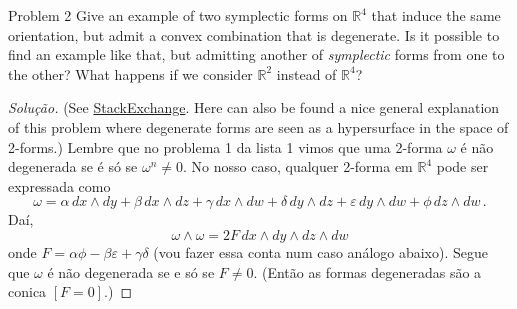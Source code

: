 \begin{idea8}{Problem 2}\leavevmode
	Give an example of two symplectic forms on $\mathbb{R}^{4}$ that induce the same orientation, but admit a convex combination that is degenerate. Is it possible to find an example like that, but admitting another of \textit{symplectic} forms from one to the other? What happens if we consider $\mathbb{R}^{2}$ instead of $\mathbb{R}^{4}$?
\end{idea8}

\begin{proof}[Solução]\leavevmode
	{\color{2} (See \href{https://math.stackexchange.com/questions/2864834/non-linear-path-between-symplectic-forms-in-mathbbr4}{StackExchange}. Here can also be found a nice general explanation of this problem where degenerate forms are seen as a hypersurface in the space of 2-forms.)}\hspace{.5em} Lembre que no problema 1 da lista 1 vimos que uma 2-forma $\omega$ é não degenerada se é só se $\omega^n\neq 0$. No nosso caso, qualquer 2-forma em $\mathbb{R}^{4}$ pode ser expressada como
	\[\omega = \alpha \, dx \wedge dy + \beta \, dx \wedge dz + \gamma \, dx \wedge dw + \delta \, dy \wedge dz + \varepsilon \, dy \wedge dw + \phi \, dz \wedge dw \, .\]
	Daí,
	\[\omega \wedge \omega =2 F \, dx \wedge dy \wedge dz \wedge dw\]
	onde $F = \alpha \phi - \beta \varepsilon + \gamma \delta$ (vou fazer essa conta num caso análogo abaixo). Segue que $\omega$ é não degenerada se e só se $F\neq 0$. {\color{2}(Então as formas degeneradas são a conica $[F=0]$.)}


\end{proof}
